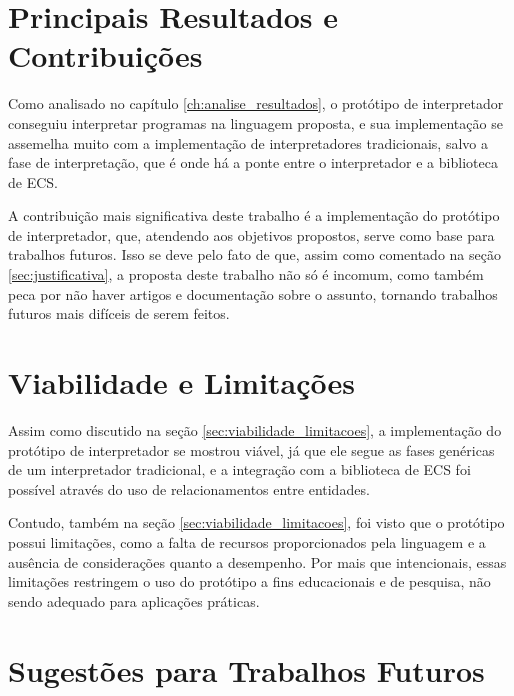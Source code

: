 \section{Principais Resultados e Contribuições}

Como analisado no capítulo \ref{ch:analise_resultados}, o protótipo de interpretador conseguiu interpretar programas na linguagem proposta, e sua implementação se assemelha muito com a implementação de interpretadores tradicionais, salvo a fase de interpretação, que é onde há a ponte entre o interpretador e a biblioteca de ECS.

A contribuição mais significativa deste trabalho é a implementação do protótipo de interpretador, que, atendendo aos objetivos propostos, serve como base para trabalhos futuros. Isso se deve pelo fato de que, assim como comentado na seção \ref{sec:justificativa}, a proposta deste trabalho não só é incomum, como também peca por não haver artigos e documentação sobre o assunto, tornando trabalhos futuros mais difíceis de serem feitos.

\section{Viabilidade e Limitações}

Assim como discutido na seção \ref{sec:viabilidade_limitacoes}, a implementação do protótipo de interpretador se mostrou viável, já que ele segue as fases genéricas de um interpretador tradicional, e a integração com a biblioteca de ECS foi possível através do uso de relacionamentos entre entidades.

Contudo, também na seção \ref{sec:viabilidade_limitacoes}, foi visto que o protótipo possui limitações, como a falta de recursos proporcionados pela linguagem e a ausência de considerações quanto a desempenho. Por mais que intencionais, essas limitações restringem o uso do protótipo a fins educacionais e de pesquisa, não sendo adequado para aplicações práticas.

\section{Sugestões para Trabalhos Futuros}



